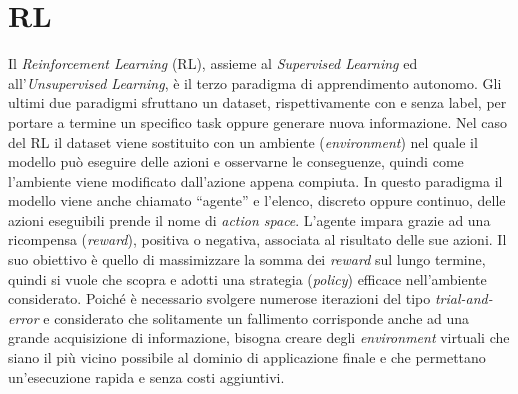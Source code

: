 

\section{RL}
Il \emph{Reinforcement Learning} (RL), assieme al \emph{Supervised Learning} ed all'\emph{Unsupervised Learning}, è il terzo paradigma di apprendimento autonomo.
Gli ultimi due paradigmi sfruttano un dataset, rispettivamente con e senza label, per portare a termine un specifico task oppure generare nuova informazione.
Nel caso del RL il dataset viene sostituito con un ambiente (\emph{environment}) nel quale il modello può eseguire delle azioni e osservarne le conseguenze, quindi come l'ambiente viene modificato dall'azione appena compiuta.
In questo paradigma il modello viene anche chiamato ``agente'' e l'elenco, discreto oppure continuo, delle azioni eseguibili prende il nome di \emph{action space}.
L'agente impara grazie ad una ricompensa (\emph{reward}), positiva o negativa, associata al risultato delle sue azioni.
Il suo obiettivo è quello di massimizzare la somma dei \emph{reward} sul lungo termine, quindi si vuole che scopra e adotti una strategia (\emph{policy}) efficace nell'ambiente considerato.
Poiché è necessario svolgere numerose iterazioni del tipo \emph{trial-and-error} e considerato che solitamente un fallimento corrisponde anche ad una grande acquisizione di informazione, bisogna creare degli \emph{environment} virtuali che siano il più vicino possibile al dominio di applicazione finale e che permettano un'esecuzione rapida e senza costi aggiuntivi.
%

